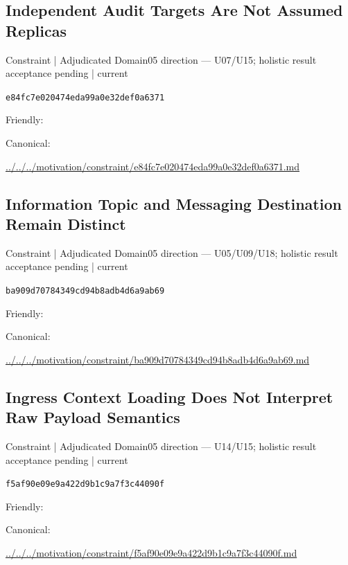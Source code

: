 \documentclass[10pt,a4paper]{article}
\begin{document}
\subsection*{Independent Audit Targets Are Not Assumed Replicas}
{\small Constraint | Adjudicated Domain05 direction — U07/U15; holistic result acceptance pending | current}\par
\texttt{e84fc7e020474eda99a0e32def0a6371}\par
Friendly: \par
Canonical: \par
{\footnotesize\url{../../../motivation/constraint/e84fc7e020474eda99a0e32def0a6371.md}}\par
\subsection*{Information Topic and Messaging Destination Remain Distinct}
{\small Constraint | Adjudicated Domain05 direction — U05/U09/U18; holistic result acceptance pending | current}\par
\texttt{ba909d70784349cd94b8adb4d6a9ab69}\par
Friendly: \par
Canonical: \par
{\footnotesize\url{../../../motivation/constraint/ba909d70784349cd94b8adb4d6a9ab69.md}}\par
\subsection*{Ingress Context Loading Does Not Interpret Raw Payload Semantics}
{\small Constraint | Adjudicated Domain05 direction — U14/U15; holistic result acceptance pending | current}\par
\texttt{f5af90e09e9a422d9b1c9a7f3c44090f}\par
Friendly: \par
Canonical: \par
{\footnotesize\url{../../../motivation/constraint/f5af90e09e9a422d9b1c9a7f3c44090f.md}}\par
\end{document}

